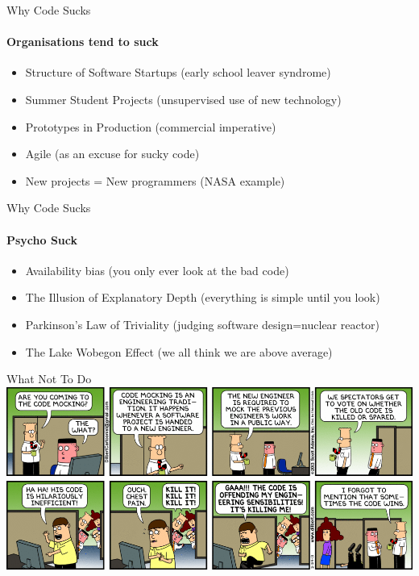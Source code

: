 \documentclass[bigger]{beamer}
\begin{document}
\begin{frame}{Why Code Sucks}
  \framesubtitle{Organisations tend to suck}
  \begin{itemize}
    \item Structure of Software Startups (early school leaver syndrome)
          \pause
    \item Summer Student Projects (unsupervised use of new technology)
          \pause
    \item Prototypes in Production (commercial imperative)
          \pause
    \item Agile (as an excuse for sucky code)
          \pause
    \item New projects = New programmers (NASA example)
  \end{itemize}
\end{frame}

\begin{frame}{Why Code Sucks}
  \framesubtitle{Psycho Suck}
  \begin{itemize}
    \item Availability bias (you only ever look at the bad code)
    \pause
    \item The Illusion of Explanatory Depth (everything is simple until you look)
    \pause
    \item Parkinson's Law of Triviality (judging software design=nuclear reactor)
    \pause
    \item The Lake Wobegon Effect (we all think we are above average)
  \end{itemize}
\end{frame}

\begin{frame}{What Not To Do}
  \includegraphics[width=\textwidth]{images/code-mocking.gif}
\end{frame}
\end{document}
